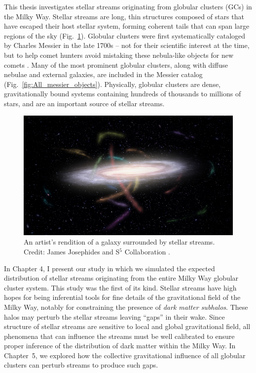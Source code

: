 This thesis investigates stellar streams originating from globular clusters (GCs) in the Milky Way. Stellar streams are long, thin structures composed of stars that have escaped their host stellar system, forming coherent tails that can span large regions of the sky (Fig.~\ref{fig:S5MilkywayStreams}). Globular clusters were first systematically cataloged by Charles Messier in the late 1700s -- not for their scientific interest at the time, but to help comet hunters avoid mistaking these nebula-like objects for new comets \citep{1781cote.rept..227M}. Many of the most prominent globular clusters, along with diffuse nebulae and external galaxies, are included in the Messier catalog (Fig.~\ref{fig:All_messier_objects}). Physically, globular clusters are dense, gravitationally bound systems containing hundreds of thousands to millions of stars, and are an important source of stellar streams.
\begin{figure}
    \centering
    \includegraphics[width=\linewidth]{images/S5MilkywayStreams.jpg}
    \caption[Artist Rendition of Stellar Streams]{An artist's rendition of a galaxy surrounded by stellar streams. Credit: James Josephides and S$^5$ Collaboration \citep{2019MNRAS.490.3508L}.}
    \label{fig:S5MilkywayStreams}
\end{figure}

In Chapter 4, I present our study in which we simulated the expected distribution of stellar streams originating from the entire Milky Way globular cluster system. This study was the first of its kind. Stellar streams have high hopes for being inferential tools for fine details of the gravitational field of the Milky Way, notably for constraining the presence of \textit{dark matter subhalos}. These halos may perturb the stellar streams leaving ``gaps'' in their wake. Since structure of stellar streams are sensitive to local and global gravitational field, all phenomena that can influence the streams must be well calibrated to ensure proper inference of the distribution of dark matter within the Milky Way. In Chapter~5, we explored how the collective gravitational influence of all globular clusters can perturb streams to produce such gaps.

